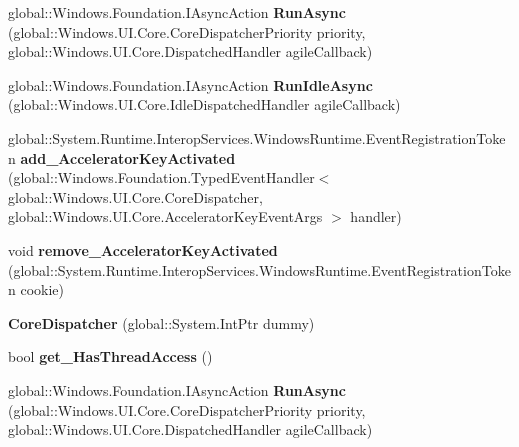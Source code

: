 \begin{DoxyCompactItemize}
global\+::\+Windows.\+Foundation.\+I\+Async\+Action {\bfseries Run\+Async} (global\+::\+Windows.\+U\+I.\+Core.\+Core\+Dispatcher\+Priority priority, global\+::\+Windows.\+U\+I.\+Core.\+Dispatched\+Handler agile\+Callback)
\item 
\mbox{\label{class_windows_1_1_u_i_1_1_core_1_1_core_dispatcher_ae1d81c29e61aa9d3e601781f291624c6}} 
global\+::\+Windows.\+Foundation.\+I\+Async\+Action {\bfseries Run\+Idle\+Async} (global\+::\+Windows.\+U\+I.\+Core.\+Idle\+Dispatched\+Handler agile\+Callback)
\item 
\mbox{\label{class_windows_1_1_u_i_1_1_core_1_1_core_dispatcher_ae59e989cb2be9847e256c8717dcf0763}} 
global\+::\+System.\+Runtime.\+Interop\+Services.\+Windows\+Runtime.\+Event\+Registration\+Token {\bfseries add\+\_\+\+Accelerator\+Key\+Activated} (global\+::\+Windows.\+Foundation.\+Typed\+Event\+Handler$<$ global\+::\+Windows.\+U\+I.\+Core.\+Core\+Dispatcher, global\+::\+Windows.\+U\+I.\+Core.\+Accelerator\+Key\+Event\+Args $>$ handler)
\item 
\mbox{\label{class_windows_1_1_u_i_1_1_core_1_1_core_dispatcher_a96732786d7ff5dad968e1ed05e297c99}} 
void {\bfseries remove\+\_\+\+Accelerator\+Key\+Activated} (global\+::\+System.\+Runtime.\+Interop\+Services.\+Windows\+Runtime.\+Event\+Registration\+Token cookie)
\item 
\mbox{\label{class_windows_1_1_u_i_1_1_core_1_1_core_dispatcher_a88a12a752cb9f80bb154d5d4f57d0d75}} 
{\bfseries Core\+Dispatcher} (global\+::\+System.\+Int\+Ptr dummy)
\item 
\mbox{\label{class_windows_1_1_u_i_1_1_core_1_1_core_dispatcher_aae3a5de5404c93a4fced870962f00905}} 
bool {\bfseries get\+\_\+\+Has\+Thread\+Access} ()
\item 
\mbox{\label{class_windows_1_1_u_i_1_1_core_1_1_core_dispatcher_ab32476eaa8140ce65276d22b3ca91205}} 
global\+::\+Windows.\+Foundation.\+I\+Async\+Action {\bfseries Run\+Async} (global\+::\+Windows.\+U\+I.\+Core.\+Core\+Dispatcher\+Priority priority, global\+::\+Windows.\+U\+I.\+Core.\+Dispatched\+Handler agile\+Callback)

\end{DoxyCompactItemize}
